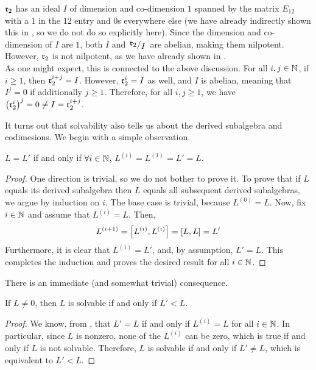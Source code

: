 \begin{boxcexample}[$\r_2$, again]
    $\r_2$ has an ideal $I$ of dimension and co-dimension $1$ spanned by the matrix $E_{12}$ with a $1$ in the $12$ entry and $0$s everywhere else (we have already indirectly shown this in , so we do not do so explicitly here). Since the dimension and co-dimension of $I$ are $1$, both $I$ and $\quotient{\r_2}{I}$ are abelian, making them nilpotent. However, $\r_2$ is not nilpotent, as we have already shown in . \\

    As one might expect, this is connected to the above discussion. For all $i, j \in \mathbb{N}$, if $i \geq 1$, then $\mathfrak{r}_2^{i+j} = I$. However, $\mathfrak{r}_2^i = I$ as well, and $I$ is abelian, meaning that $I^j = 0$ if additionally $j \geq 1$. Therefore, for all $i, j \geq 1$, we have $\left( \mathfrak{r}_2^i \right)^j = 0 \neq I = \mathfrak{r}_2^{i + j}$.
\end{boxcexample}

It turns out that solvability also tells us about the derived subalgebra and codimesions. We begin with a simple observation.

\begin{boxlemma}\label{Ch1:Lemma:AllDerivsOfDerivEqTop}
    $L = L'$ if and only if $\forall i \in \mathbb{N}$, $L^{(i)} = L^{(1)} = L' = L$.
\end{boxlemma}
\begin{proof}
    One direction is trivial, so we do not bother to prove it. To prove that if $L$ equals its derived subalgebra then $L$ equals all subsequent derived subalgebras, we argue by induction on $i$. The base case is trivial, because $L^{(0)} = L$. Now, fix $i \in \mathbb{N}$ and assume that $L^{(i)} = L$. Then,
    \begin{align*}
        L^{(i + 1)} = \left[ L^{(i)}, L^{(i)} \right] = \left[ L, L \right] = L'
    \end{align*}
    Furthermore, it is clear that $L^{(1)} = L'$, and, by assumption, $L' = L$. This completes the induction and proves the desired result for all $i \in \mathbb{N}$.
\end{proof}

There is an immediate (and somewhat trivial) consequence.

\begin{boxcorollary}\label{Ch1:Cor:DerivedSubalgLtOfSolvable}
    If $L \neq 0$, then $L$ is solvable if and only if $L' < L$.
\end{boxcorollary}
\begin{proof}
    We know, from , that $L' = L$ if and only if $L^{(i)} = L$ for all $i \in \mathbb{N}$. In particular, since $L$ is nonzero, none of the $L^{(i)}$ can be zero, which is true if and only if $L$ is not solvable. Therefore, $L$ is solvable if and only if $L' \neq L$, which is equivalent to $L' < L$.
\end{proof}

